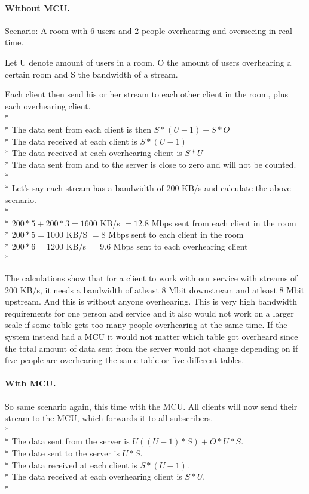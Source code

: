 \documentclass[12pt, titlepage]{article}
\begin{document}
\paragraph{Without MCU.}
Scenario: A room with 6 users and 2 people overhearing and overseeing in real-time.

Let U denote amount of users in a room, O the amount of users overhearing a certain room and S the bandwidth of a stream. 

Each client then send his or her stream to each other client in the room, plus each overhearing client.
\\*
\\*
The data sent from each client is then $S*(U-1)+S*O$\\*
The data received at each client is $S*(U-1)$\\*
The data received at each overhearing client is $S*U$\\*
The data sent from and to the server is close to zero and will not be counted.
\\*\\*
Let’s say each stream has a bandwidth of 200 KB/s and calculate the above scenario.
\\*
\\*
$200*5 + 200*3 = 1600$ KB/s $= 12.8$ Mbps sent from each client in the room\\*
$200*5 = 1000$ KB/S  $= 8$ Mbps sent to each client in the room\\*
$200*6 = 1200$ KB/s $= 9.6$ Mbps sent to each overhearing client\\*

The calculations show that for a client to work with our service with streams of $200$ KB/s, it needs a bandwidth of atleast 8 Mbit downstream and atleast 8 Mbit upstream. And this is without anyone overhearing. This is very high bandwidth requirements for one person and service and it also would not work on a larger scale if some table gets too many people overhearing at the same time. If the system instead had a MCU it would not matter which table got overheard since the total amount of data sent from the server would not change depending on if five people are overhearing the same table or five different tables.
\paragraph{With MCU.}
So same scenario again, this time with the MCU. All clients will now send their stream to the MCU, which forwards it to all subscribers.
\\*
\\*
The data sent from the server is $U((U-1)*S) + O*U*S$.\\* 
The date sent to the server is $U*S$.\\*
The data received at each client is $S*(U-1)$.\\*
The data received at each overhearing client is $S*U$.\\*
\end{document}
